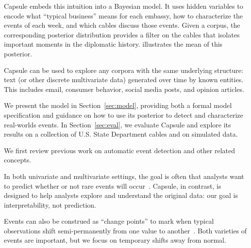 Capsule embeds this intuition into a Bayesian model. It uses hidden
variables to encode what ``typical business'' means for each embassy,
how to characterize the events of each week, and which cables discuss
those events. Given a corpus, the corresponding posterior distribution
provides a filter on the cables that isolates important moments in the
diplomatic history.  illustrates the mean of this
posterior.

Capsule can be used to explore any corpora with the same underlying
structure: text (or other discrete multivariate data) generated over time by known entities.  This includes
email, consumer behavior, social media posts, and opinion articles.

We present the model in Section~\ref{sec:model}, providing both a formal
model specification and guidance on how to use its posterior to detect 
and characterize real-worlds events.
In Section~\ref{sec:eval}, we evaluate Capsule and explore its results on
a collection of U.S. State Department cables and on simulated data.

 We first review previous work on automatic
event detection and other related concepts.

In both univariate and multivariate settings, the goal is often that analysts want to predict whether or not rare events will occur~\cite{weiss1998learning,das2008anomaly}.  Capsule, in contrast, is designed to help analysts explore and understand the original data: our goal is interpretability, not prediction.

Events can also be construed as ``change points'' to mark when typical observations shift semi-permanently from one value to another~\cite{guralnik1999event,adams2007bayesian}. Both varieties of events are important, but we focus on temporary shifts away from normal.

